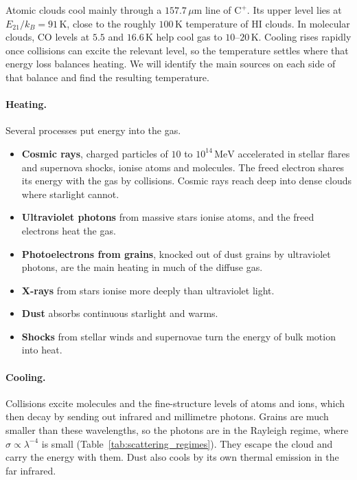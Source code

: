 Atomic clouds cool mainly through a $157.7\,\mu\mathrm m$ line of $\mathrm{C^+}$. Its upper level lies at $E_{21}/k_B=91\,\mathrm K$, close to the roughly $100\,\mathrm K$ temperature of HI clouds. In molecular clouds, CO levels at $5.5$ and $16.6\,\mathrm K$ help cool gas to $10$--$20\,\mathrm K$. Cooling rises rapidly once collisions can excite the relevant level, so the temperature settles where that energy loss balances heating. We will identify the main sources on each side of that balance and find the resulting temperature.

\paragraph{Heating.} Several processes put energy into the gas.
\begin{itemize}
	\item \textbf{Cosmic rays}, charged particles of $10$ to $10^{14}\,\mathrm{MeV}$ accelerated in stellar flares and supernova shocks, ionise atoms and molecules. The freed electron shares its energy with the gas by collisions. Cosmic rays reach deep into dense clouds where starlight cannot.
	\item \textbf{Ultraviolet photons} from massive stars ionise atoms, and the freed electrons heat the gas.
	\item \textbf{Photoelectrons from grains}, knocked out of dust grains by ultraviolet photons, are the main heating in much of the diffuse gas.
	\item \textbf{X-rays} from stars ionise more deeply than ultraviolet light.
	\item \textbf{Dust} absorbs continuous starlight and warms.
	\item \textbf{Shocks} from stellar winds and supernovae turn the energy of bulk motion into heat.
\end{itemize}

\paragraph{Cooling.} Collisions excite molecules and the fine-structure levels of atoms and ions, which then decay by sending out infrared and millimetre photons. Grains are much smaller than these wavelengths, so the photons are in the Rayleigh regime, where $\sigma\propto\lambda^{-4}$ is small (Table~\ref{tab:scattering_regimes}). They escape the cloud and carry the energy with them. Dust also cools by its own thermal emission in the far infrared.

